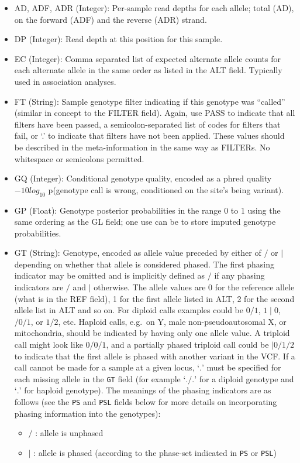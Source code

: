 \documentclass[8pt]{article}
\begin{document}
\begin{itemize}
\renewcommand{\labelitemii}{$\circ$}
  \item AD, ADF, ADR (Integer): Per-sample read depths for each allele; total (AD), on the forward (ADF) and the reverse (ADR) strand.
  \item DP (Integer): Read depth at this position for this sample.
  \item EC (Integer): Comma separated list of expected alternate allele counts for each alternate allele in the same order as listed in the ALT field.
  Typically used in association analyses.
  \item FT (String): Sample genotype filter indicating if this genotype was ``called'' (similar in concept to the FILTER field).
  Again, use PASS to indicate that all filters have been passed, a semicolon-separated list of codes for filters that fail, or `.' to indicate that filters have not been applied.
  These values should be described in the meta-information in the same way as FILTERs.
  No whitespace or semicolons permitted.
  \item GQ (Integer): Conditional genotype quality, encoded as a phred quality $-10log_{10}$ p(genotype call is wrong, conditioned on the site's being variant).
  \item GP (Float): Genotype posterior probabilities in the range 0 to 1 using the same ordering as the GL field; one use can be to store imputed genotype probabilities.
  \item GT (String): Genotype, encoded as allele value preceded by either of $/$ or $\mid$ depending on whether that allele is considered phased.
    The first phasing indicator may be omitted and is implicitly defined as $/$ if any phasing indicators are $/$ and $\mid$ otherwise.
    The allele values are 0 for the reference allele (what is in the REF field), 1 for the first allele listed in ALT, 2 for the second allele list in ALT and so on.
    For diploid calls examples could be $0/1$, $1\mid0$, $/0/1$, or $1/2$, etc.
    Haploid calls, e.g.\ on Y, male non-pseudoautosomal X, or mitochondria, should be indicated by having only one allele value.
    A triploid call might look like $0/0/1$, and a partially phased triploid call could be $|0/1/2$ to indicate that the first allele is phased with another variant in the VCF.
    If a call cannot be made for a sample at a given locus, `$.$' must be specified for each missing allele in the {\tt GT} field (for example `$./.$' for a diploid genotype and `$.$' for haploid genotype).
    The meanings of the phasing indicators are as follows (see the {\tt PS} and {\tt PSL} fields below for more details on incorporating phasing information into the genotypes):
    \begin{itemize}
      \item $/$ : allele is unphased
      \item $\mid$ : allele is phased (according to the phase-set indicated in {\tt PS} or {\tt PSL})
    \end{itemize}


\end{itemize}
\end{document}
